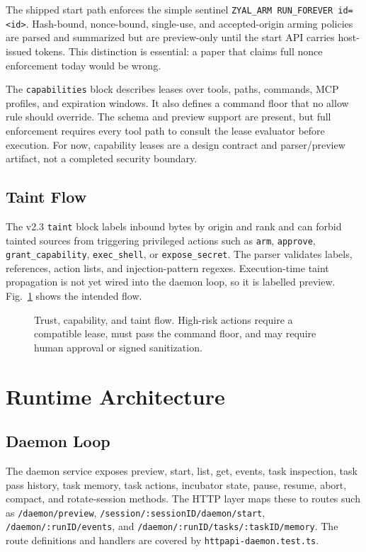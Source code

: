 \documentclass[conference]{IEEEtran}
\begin{document}
The shipped start path enforces the simple sentinel \texttt{ZYAL\_ARM RUN\_FOREVER id=<id>}. Hash-bound, nonce-bound, single-use, and accepted-origin arming policies are parsed and summarized but are preview-only until the start API carries host-issued tokens. This distinction is essential: a paper that claims full nonce enforcement today would be wrong.

The \texttt{capabilities} block describes leases over tools, paths, commands, MCP profiles, and expiration windows. It also defines a command floor that no allow rule should override. The schema and preview support are present, but full enforcement requires every tool path to consult the lease evaluator before execution. For now, capability leases are a design contract and parser/preview artifact, not a completed security boundary.

\subsection{Taint Flow}

The v2.3 \texttt{taint} block labels inbound bytes by origin and rank and can forbid tainted sources from triggering privileged actions such as \texttt{arm}, \texttt{approve}, \texttt{grant\_capability}, \texttt{exec\_shell}, or \texttt{expose\_secret}. The parser validates labels, references, action lists, and injection-pattern regexes. Execution-time taint propagation is not yet wired into the daemon loop, so it is labelled preview. Fig.~\ref{fig:taint} shows the intended flow.

\begin{figure}[t]
\centering
\resizebox{\textwidth}{!}{}
\caption{Trust, capability, and taint flow. High-risk actions require a compatible lease, must pass the command floor, and may require human approval or signed sanitization.}
\label{fig:taint}
\end{figure}

\section{Runtime Architecture}

\subsection{Daemon Loop}

The daemon service exposes preview, start, list, get, events, task inspection, task pass history, task memory, task actions, incubator state, pause, resume, abort, compact, and rotate-session methods. The HTTP layer maps these to routes such as \texttt{/daemon/preview}, \texttt{/session/:sessionID/daemon/start}, \texttt{/daemon/:runID/events}, and \texttt{/daemon/:runID/tasks/:taskID/memory}. The route definitions and handlers are covered by \texttt{httpapi-daemon.test.ts}.
\end{document}
